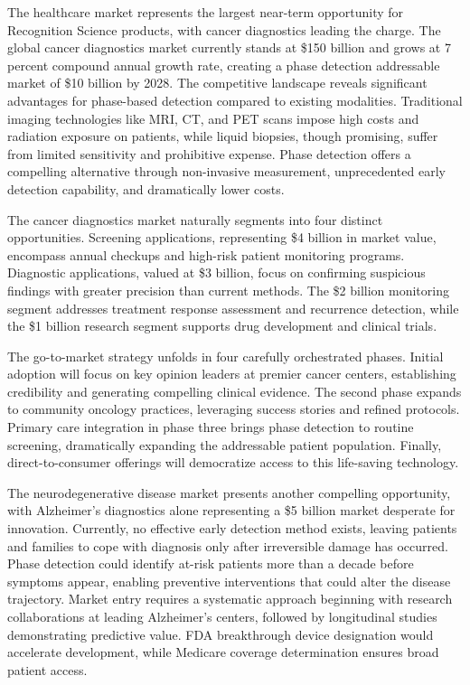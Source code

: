 \documentclass[12pt,a4paper]{report}
\begin{document}
The healthcare market represents the largest near-term opportunity for Recognition Science products, with cancer diagnostics leading the charge. The global cancer diagnostics market currently stands at \$150 billion and grows at 7 percent compound annual growth rate, creating a phase detection addressable market of \$10 billion by 2028. The competitive landscape reveals significant advantages for phase-based detection compared to existing modalities. Traditional imaging technologies like MRI, CT, and PET scans impose high costs and radiation exposure on patients, while liquid biopsies, though promising, suffer from limited sensitivity and prohibitive expense. Phase detection offers a compelling alternative through non-invasive measurement, unprecedented early detection capability, and dramatically lower costs.

The cancer diagnostics market naturally segments into four distinct opportunities. Screening applications, representing \$4 billion in market value, encompass annual checkups and high-risk patient monitoring programs. Diagnostic applications, valued at \$3 billion, focus on confirming suspicious findings with greater precision than current methods. The \$2 billion monitoring segment addresses treatment response assessment and recurrence detection, while the \$1 billion research segment supports drug development and clinical trials. 

The go-to-market strategy unfolds in four carefully orchestrated phases. Initial adoption will focus on key opinion leaders at premier cancer centers, establishing credibility and generating compelling clinical evidence. The second phase expands to community oncology practices, leveraging success stories and refined protocols. Primary care integration in phase three brings phase detection to routine screening, dramatically expanding the addressable patient population. Finally, direct-to-consumer offerings will democratize access to this life-saving technology.

The neurodegenerative disease market presents another compelling opportunity, with Alzheimer's diagnostics alone representing a \$5 billion market desperate for innovation. Currently, no effective early detection method exists, leaving patients and families to cope with diagnosis only after irreversible damage has occurred. Phase detection could identify at-risk patients more than a decade before symptoms appear, enabling preventive interventions that could alter the disease trajectory. Market entry requires a systematic approach beginning with research collaborations at leading Alzheimer's centers, followed by longitudinal studies demonstrating predictive value. FDA breakthrough device designation would accelerate development, while Medicare coverage determination ensures broad patient access.
\end{document}
